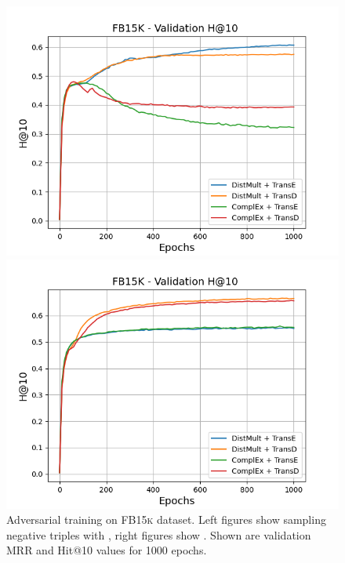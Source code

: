 \begin{figure}[H]
\begin{minipage}{.5\textwidth}
    \end{minipage}
    \begin{minipage}{.5\textwidth}
      \centering
      \includegraphics[width=0.9\linewidth]{figures/results/gan_train/not_pretrained/uncertainty/max/entropy/fb15k/1k_epochs/uncertainty_fb15k_hit10.png}
    \end{minipage}%
    \begin{minipage}{.5\textwidth}
      \centering
      \includegraphics[width=0.9\linewidth]{figures/results/gan_train/not_pretrained/uncertainty/max_distribution/entropy/fb15k/1k_epochs/uncertainty_fb15k_hit10.png}
    \end{minipage}%
    \caption{Adversarial training on \textsc{FB15k} dataset. 
    Left figures show sampling negative triples with \usmax, right figures show \ussoftmax.
    Shown are validation MRR and Hit@10 values for 1000 epochs.}
    \label{fig:advtrain_fb15k_usmax_ussoftmax}
\end{figure}
\clearpage

